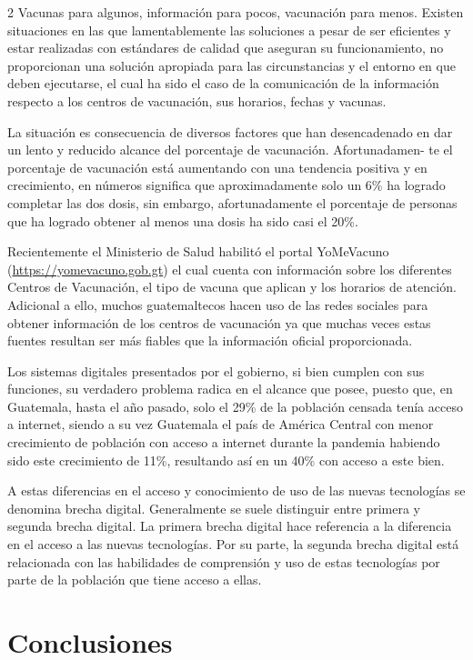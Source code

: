 \documentclass[12pt,spanish,Letterpaper,openany]{book}
\begin{document}
\begin {multicols}{2}
Vacunas para algunos, información para pocos, vacunación para menos.
Existen situaciones en las que lamentablemente las soluciones a pesar de ser eficientes y estar
realizadas con estándares de calidad que aseguran su funcionamiento, no proporcionan una
solución apropiada para las circunstancias y el entorno en que deben ejecutarse, el cual ha
sido el caso de la comunicación de la información respecto a los centros de vacunación, sus
horarios, fechas y vacunas.

La situación es consecuencia de diversos factores que han desencadenado en dar un lento y
reducido alcance del porcentaje de vacunación. Afortunadamen-
te el porcentaje de
vacunación está aumentando con una tendencia positiva y en crecimiento, en números
significa que aproximadamente solo un 6\% ha logrado completar las dos dosis, sin embargo,
afortunadamente el porcentaje de personas que ha logrado obtener al menos una dosis ha sido
casi el 20\%.

Recientemente el Ministerio de Salud habilitó el portal YoMeVacuno
(\url{https://yomevacuno.gob.gt}) el cual cuenta con información sobre los diferentes Centros de
Vacunación, el tipo de vacuna que aplican y los horarios de atención. Adicional a ello,
muchos guatemaltecos hacen uso de las redes sociales para obtener información de los
centros de vacunación ya que muchas veces estas fuentes resultan ser más fiables que la
información oficial proporcionada.

Los sistemas digitales presentados por el gobierno, si bien cumplen con sus funciones, su
verdadero problema radica en el alcance que posee, puesto que, en Guatemala, hasta el año
pasado, solo el 29\% de la población censada tenía acceso a internet, siendo a su vez
Guatemala el país de América Central con menor crecimiento de población con acceso a
internet durante la pandemia habiendo sido este crecimiento de 11\%, resultando así en un
40\% con acceso a este bien.

A estas diferencias en el acceso y conocimiento de uso de las nuevas tecnologías se denomina
brecha digital. Generalmente se suele distinguir entre primera y segunda brecha digital. La
primera brecha digital hace referencia a la diferencia en el acceso a las nuevas tecnologías.
Por su parte, la segunda brecha digital está relacionada con las habilidades de comprensión
y uso de estas tecnologías por parte de la población que tiene acceso a ellas.

\hypertarget{conclusiones-7}{%
\section{Conclusiones}\label{conclusiones-7}}


\end{multicols}
\end{document}
